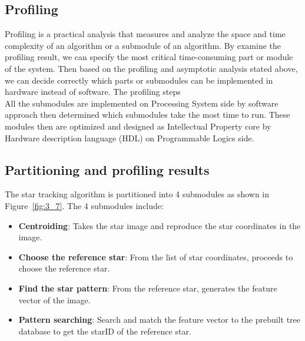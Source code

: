 
\subsection{Profiling}

Profiling is a practical analysis that measures and analyze the space and time complexity of an algorithm or a submodule of an algorithm. By examine the profiling result, we can specify the most critical time-consuming part or module of the system. Then based on the profiling and asymptotic analysis stated above, we can decide correctly which parts or submodules can be implemented in hardware instead of software. The profiling steps \\

\noindent All the submodules are implemented on Processing System side by software approach then determined which submodules take the most time to run. These modules then are optimized and designed as Intellectual Property core by Hardware description language (HDL) on Programmable Logics side. \\


\subsection{Partitioning and profiling results}

The star tracking algorithm is partitioned into 4 submodules as shown in Figure~\ref{fig:3_7}. The 4 submodules include:
\begin{itemize}
	\item \textbf{Centroiding}: Takes the star image and reproduce the star coordinates in the image.
	\item \textbf{Choose the reference star}: From the list of star coordinates, proceeds to choose the reference star.
	\item \textbf{Find the star pattern}: From the reference star, generates the feature vector of the image.
	\item \textbf{Pattern searching}: Search and match the feature vector to the prebuilt tree database to get the starID of the reference star.
\end{itemize}


